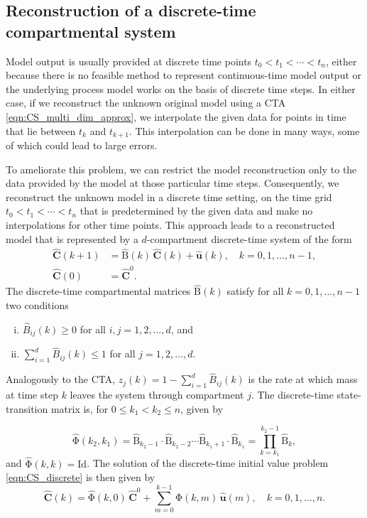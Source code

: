 \documentclass[draft]{agujournal2019}
\renewcommand{\vec}[1]{\mathbf{#1}}
\newcommand{\tens}[1]{\mathrm{#1}}
\newcommand{\id}{\tens{Id}}
\newcommand{\suml}{\sum\limits}
\begin{document}
\subsection{Reconstruction of a discrete-time compartmental system}
    Model output is usually provided at discrete time points $t_0<t_1<\cdots<t_n$, either because there is no feasible method to represent continuous-time model output or the underlying process model works on the basis of discrete time steps.
    In either case, if we reconstruct the unknown original model using a CTA \eqref{eqn:CS_multi_dim_approx}, we interpolate the given data for points in time that lie between $t_k$ and $t_{k+1}$.
    This interpolation can be done in many ways, some of which could lead to large errors. 
        
    To ameliorate this problem, we can restrict the model reconstruction only to the data provided by the model at those particular time steps.
    Consequently, we reconstruct the unknown model in a discrete time setting, on the time grid $t_0<t_1<\cdots<t_n$ that is predetermined by the given data and make no interpolations for  other time points.
    This approach leads to a reconstructed model that is represented by a $d$-compartment discrete-time system of the form
    \begin{equation}\label{eqn:CS_discrete}
        \begin{aligned}
            \widehat{\vec{C}}(k+1) &= \widehat{\tens{B}}(k)\,\widehat{\vec{C}}(k) + \widehat{\vec{u}}(k),\quad k=0,1,\ldots,n-1,\\
            \widehat{\vec{C}}(0) &= \widehat{\vec{C}}^0.
        \end{aligned}
    \end{equation}
    The discrete-time compartmental matrices $\widehat{\tens{B}}(k)$ satisfy for all $k=0,1,\ldots,n-1$ two conditions
    \begin{enumerate}[(i)]
        \item $\widehat{B}_{ij}(k)\geq0$ for all $i,j=1,2,\ldots,d$, and
        \item $\suml_{i=1}^d \widehat{B}_{ij}(k)\leq 1$ for all $j=1,2,\ldots,d$.
    \end{enumerate}
    Analogously to the CTA, $\widehat{z}_j(k)=1-\sum_{i=1}^d \widehat{B}_{ij}(k)$ is the rate at which mass at time step $k$ leaves the system through compartment $j$.
    The discrete-time state-transition matrix is, for $0\leq k_1<k_2\leq n$, given by
    
    \begin{equation*}
        \widehat{\tens{\Phi}}(k_2,k_1) = \widehat{\tens{B}}_{k_2-1}\cdot\widehat{\tens{B}}_{k_2-2}\cdots\widehat{\tens{B}}_{k_1+1}\cdot\widehat{\tens{B}}_{k_1} = \prod\limits_{k=k_1}^{k_2-1}\widehat{\tens{B}}_k,
    \end{equation*}
    and $\widehat{\tens{\Phi}}(k,k)=\id$.
    The solution of the discrete-time initial value problem \eqref{eqn:CS_discrete} is then given by
    \begin{equation*}
        \widehat{\vec{C}}(k) = \widehat{\tens{\Phi}}(k,0)\,\widehat{\vec{C}}^0 + \suml_{m=0}^{k-1} \widehat{\tens{\Phi}}(k,m)\,\widehat{\vec{u}}(m),\quad k=0,1,\ldots,n.
    \end{equation*}
    
\end{document}
